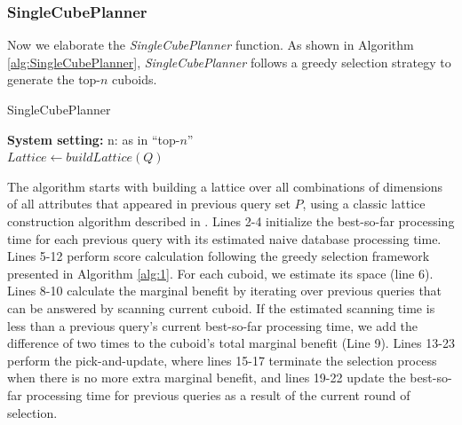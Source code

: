 	\subsubsection{SingleCubePlanner}
	\label{SingleCubePlanner}
	
	Now we elaborate the \emph{SingleCubePlanner} function. As shown in Algorithm \ref{alg:SingleCubePlanner}, \emph{SingleCubePlanner} follows a greedy selection strategy to generate the top-$n$ cuboids.
	
	\begin{algorithm}%
		\label{alg:SingleCubePlanner}
		\caption{SingleCubePlanner}
		\LinesNumbered
		\textbf{System setting:} n: as in ``top-$n$''\\
		$Lattice \leftarrow buildLattice(Q)$\;
		
	\end{algorithm}
	
	
	The algorithm starts with building a lattice over all combinations of dimensions of all attributes that appeared in previous query set $P$, using a classic lattice construction algorithm described in \cite{DBLP:journals/ipl/NourineR99}. Lines 2-4 initialize the best-so-far processing time for each previous query with its estimated naive database processing time. Lines 5-12 perform score calculation following the greedy selection framework presented in Algorithm \ref{alg:1}. For each cuboid, we estimate its space (line 6). Lines 8-10 calculate the marginal benefit by iterating over previous queries that can be answered by scanning current cuboid. If the estimated scanning time is less than a previous query's current best-so-far processing time, we add the difference of two times to the cuboid's total marginal benefit (Line 9). Lines 13-23 perform the pick-and-update, where lines 15-17 terminate the selection process when there is no more extra marginal benefit, and lines 19-22 update the best-so-far processing time for previous queries as a result of the current round of selection.
	
